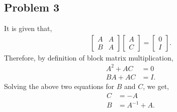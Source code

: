 \subsection*{Problem 3}
It is given that,
\begin{align*}
	\begin{bmatrix}A & A\\B & A\end{bmatrix}\begin{bmatrix}A\\C\end{bmatrix} = \begin{bmatrix}0\\I\end{bmatrix}.
\end{align*}
Therefore, by definition of block matrix multiplication,
\begin{align*}
	A^2 + AC &= 0\\
	BA + AC &= I.
\end{align*}
Solving the above two equations for $B$ and $C$, we get,
\begin{align*}
	C &= -A\\
	B &= A^{-1}+A.
\end{align*}
